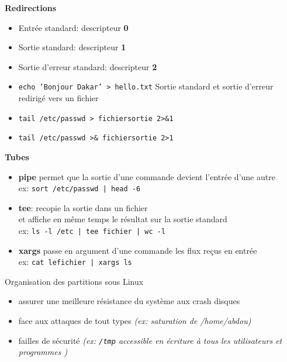 \documentclass[french]{beamer}
\begin{document}
\begin{frame}
\textbf{Redirections} \\
    \begin{itemize}
    \item Entrée standard: descripteur \textbf{0}
    \item Sortie standard: descripteur \textbf{1}
    \item Sortie d'erreur standard: descripteur \textbf{2}
    \item \texttt{echo 'Bonjour Dakar' > hello.txt}
    Sortie standard et sortie d'erreur redirigé vers un fichier
    \item \texttt{tail /etc/passwd > fichiersortie 2>\&1 }
    \item \texttt{tail /etc/passwd >\& fichiersortie 2>1 }
    \end{itemize}
\end{frame}


\begin{frame}
\textbf{Tubes}
    \begin{itemize}
    \item \textbf{pipe} permet que la sortie d'une commande devient l'entrée
    d'une autre \\
    ex: \texttt{sort /etc/passwd | head -6}
    \item \textbf{tee}: recopie la sortie dans un fichier \\et affiche en même
    temps le résultat sur la sortie standard \\
    ex: \texttt{ls -l /etc | tee fichier | wc  -l}
    \item \textbf{xargs} passe en argument d'une commande les flux reçus en
    entrée\\
    ex: \texttt{cat lefichier | xargs ls}

    \end{itemize}
\end{frame}




\begin{frame}
Organisation des partitions sous Linux
\begin{itemize}
\item assurer une meilleure résistance du système aux crash disques
\item face aux attaques de tout types \textit{(ex: saturation de /home/abdou)}
\item failles de sécurité \textit{(ex: \texttt{/tmp} accessible en écriture à tous les utilisateurs et programmes )}
\end{itemize}
\end{frame}
\end{document}
